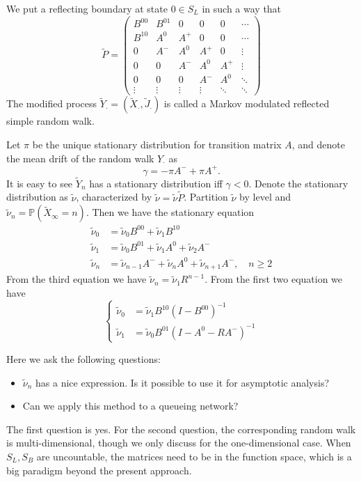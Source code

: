 \begin{definition}
We put a reflecting boundary at state $0\in S_L$ in such a way that
\[
\tilde{P}=\begin{pmatrix}
B^{00}&B^{01}&0&0&0&\cdots\\
B^{10}&A^0&A^+&0&0&\cdots\\
0&A^-&A^0&A^+&0&\vdots\\
0&0&A^-&A^0&A^+&\vdots\\
0&0&0&A^-&A^0&\ddots\\
\vdots&\vdots&\vdots&\vdots&\ddots&\ddots
\end{pmatrix}
\]
The modified process $\tilde{Y}_{\cdot}=(\tilde{X}_{\cdot}, \tilde{J}_{\cdot})$ is called a Markov modulated reflected simple random walk.
\end{definition}

Let $\pi$ be the unique stationary distribution for transition matrix $A$, and denote the mean drift of the random walk $Y_{\cdot}$ as
\[
\gamma = -\pi A^- + \pi A^+.
\]
It is easy to see $\tilde{Y}_n$ has a stationary distribution iff $\gamma<0$.
Denote the stationary distribution as $\tilde{\nu}$, characterized by $\tilde{\nu}=\tilde{\nu}\tilde{P}$.
Partition $\tilde{\nu}$ by level and $\tilde{\nu}_n=\mathbb{P}(\tilde{X}_\infty=n)$.
Then we have the stationary equation
\begin{align*}
\tilde{\nu}_0&=\tilde{\nu}_0B^{00} + \tilde{\nu}_1B^{10}\\
\tilde{\nu}_1&=\tilde{\nu}_0B^{01} + \tilde{\nu}_1A^0 + \tilde{\nu}_2A^-\\
\tilde{\nu}_n&=\tilde{\nu}_{n-1}A^{-} + \tilde{\nu}_nA^0 + \tilde{\nu}_{n+1}A^-,\quad n\ge2
\end{align*}
From the third equation we have $\tilde{\nu}_n = \tilde{\nu}_1R^{n-1}$. From the first two equation we have
\[
\left\{
\begin{aligned}
\tilde{\nu}_0&=\tilde{\nu}_1B^{10}(I - B^{00})^{-1}\\
\tilde{\nu}_1&=\tilde{\nu}_0B^{01}(I - A^0 - RA^{-})^{-1}
\end{aligned}
\right.
\]

Here we ask the following questions:
\begin{itemize}
\item
$\tilde{\nu}_n$ has a nice expression. Is it possible to use it for asymptotic analysis?
\item
Can we apply this method to a queueing network?
\end{itemize}
The first question is yes.
For the second question, the corresponding random walk is multi-dimensional, though we only discuss for the one-dimensional case. 
When $S_L, S_B$ are uncountable, the matrices need to be in the function space, which is a big paradigm beyond the present approach.









